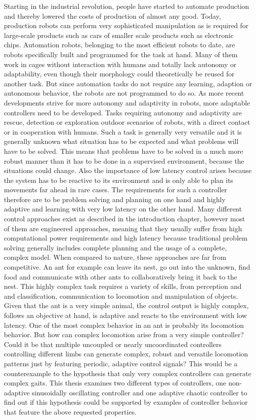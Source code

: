 \documentclass[main]{subfiles}
\begin{document}
Starting in the industrial revolution, people have started to automate production and thereby lowered the costs of production of almost any good. Today, production robots can perform very sophisticated manipulation as is required for large-scale products such as cars of smaller scale products such as electronic chips. Automation robots, belonging to the most efficient robots to date, are robots specifically built and programmed for the task at hand. Many of them work in cages without interaction with humans and totally lack autonomy or adaptability, even though their morphology could theoretically be reused for another task. But since automation tasks do not require any learning, adaption or autonomous behavior, the robots are not programmed to do so. As more recent developments strive for more autonomy and adaptivity in robots, more adaptable controllers need to be developed. Tasks requiring autonomy and adaptivity are rescue, detection or exploration outdoor scenarios of robots, with a direct contact or in cooperation with humans. Such a task is generally very versatile and it is generally unknown what situation has to be expected and what problems will have to be solved. This means that problems have to be solved in a much more robust manner than it has to be done in a supervised environment, because the situations could change. Also the importance of low latency control arises because the system has to be reactive to its environment and is only able to plan its movements far ahead in rare cases. The requirements for such a controller therefore are to be problem solving and planning on one hand and highly adaptive and learning with very low latency on the other hand. Many different control approaches exist as described in the introduction chapter, however most of them are engineered approaches, meaning that they usually suffer from high computational power requirements and high latency because traditional problem solving generally includes complete planning and the usage of a complete, complex model. When compared to nature, these approaches are far from competitive. An ant for example can leave its nest, go out into the unknown, find food and communicate with other ants to collaboratively bring it back to the nest. This highly complex task requires a variety of skills, from perception and and classification, communication to locomotion and manipulation of objects. Given that the ant is a very simple animal, the control output is highly complex, follows an objective at hand, is adaptive and reacts to the environment with low latency. One of the most complex behavior in an ant is probably its locomotion behavior. But how can complex locomotion arise from a very simple controller? Could it be that multiple uncoupled or nearly uncoordinated controllers controlling different limbs can generate complex, robust and versatile locomotion patterns just by featuring periodic, adaptive control signals? This would be a counterexample to the hypothesis that only very complex controllers can generate complex gaits. This thesis examines two different types of controllers, one non-adaptive sinusoidally oscillating controller and one adaptive chaotic controller to find out if this hypothesis could be supported by examples of controller behavior that feature the above requested properties.
\end{document}
